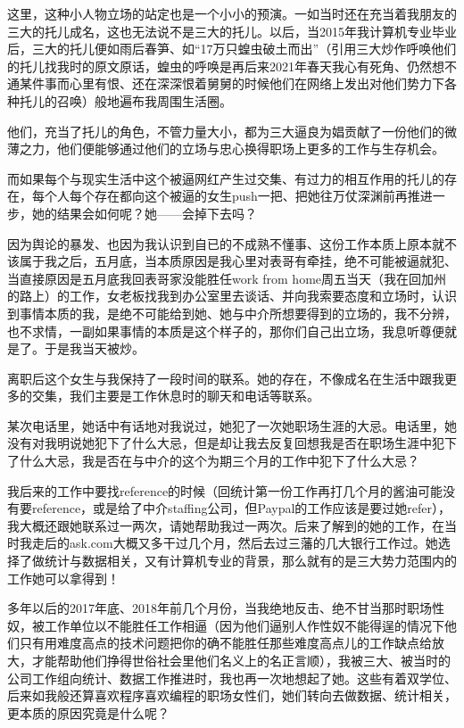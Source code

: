 \documentclass[9pt, b5paper]{article}
\begin{document}
这里，这种小人物立场的站定也是一个小小的预演。一如当时还在充当着我朋友的三大的托儿成名，这也无法说不是三大的托儿。以后，当2015年我计算机专业毕业后，三大的托儿便如雨后春笋、如“17万只蝗虫破土而出”（引用三大炒作呼唤他们的托儿找我时的原文原话，蝗虫的呼唤是再后来2021年春天我心有死角、仍然想不通某件事而心里有恨、还在深深恨着舅舅的时候他们在网络上发出对他们势力下各种托儿的召唤）般地遍布我周围生活圈。

他们，充当了托儿的角色，不管力量大小，都为三大逼良为娼贡献了一份他们的微薄之力，他们便能够通过他们的立场与忠心换得职场上更多的工作与生存机会。

而如果每个与现实生活中这个被逼网红产生过交集、有过力的相互作用的托儿的存在，每个人每个存在都向这个被逼的女生push一把、把她往万仗深渊前再推进一步，她的结果会如何呢？她——会掉下去吗？

因为舆论的暴发、也因为我认识到自已的不成熟不懂事、这份工作本质上原本就不该属于我之后，五月底，当本质原因是我心里对表哥有牵挂，绝不可能被逼就犯、当直接原因是五月底我回表哥家没能胜任work from home周五当天（我在回加州的路上）的工作，女老板找我到办公室里去谈话、并向我索要态度和立场时，认识到事情本质的我，是绝不可能给到她、她与中介所想要得到的立场的，我不分辨，也不求情，一副如果事情的本质是这个样子的，那你们自己出立场，我息听尊便就是了。于是我当天被炒。 

离职后这个女生与我保持了一段时间的联系。她的存在，不像成名在生活中跟我更多的交集，我们主要是工作休息时的聊天和电话等联系。

某次电话里，她话中有话地对我说过，她犯了一次她职场生涯的大忌。电话里，她没有对我明说她犯下了什么大忌，但是却让我去反复回想我是否在职场生涯中犯下了什么大忌，我是否在与中介的这个为期三个月的工作中犯下了什么大忌？

我后来的工作中要找reference的时候（回统计第一份工作再打几个月的酱油可能没有要reference，或是给了中介staffing公司，但Paypal的工作应该是要过她refer），我大概还跟她联系过一两次，请她帮助我过一两次。后来了解到的她的工作，在当时我走后的ask.com大概又多干过几个月，然后去过三藩的几大银行工作过。她选择了做统计与数据相关，又有计算机专业的背景，那么就有的是三大势力范围内的工作她可以拿得到！

多年以后的2017年底、2018年前几个月份，当我绝地反击、绝不甘当那时职场性奴，被工作单位以不能胜任工作相逼（因为他们逼别人作性奴不能得逞的情况下他们只有用难度高点的技术问题把你的确不能胜任那些难度高点儿的工作缺点给放大，才能帮助他们挣得世俗社会里他们名义上的名正言顺），我被三大、被当时的公司工作组向统计、数据工作推进时，我也再一次地想起了她。这些有着双学位、后来如我般还算喜欢程序喜欢编程的职场女性们，她们转向去做数据、统计相关，更本质的原因究竟是什么呢？ 
\end{document}
